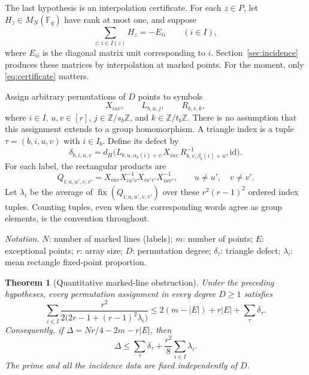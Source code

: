 \documentclass[11pt]{amsart}
\newtheorem{theorem}{Theorem}[section]
\theoremstyle{definition}
\theoremstyle{remark}
\numberwithin{equation}{section}
\newcommand{\F}{\mathbb F}
\newcommand{\Z}{\mathbb Z}
\newcommand{\id}{\mathrm{id}}
\begin{document}
The last hypothesis is an interpolation certificate. For each
$z\in P$, let $H_z\in M_N(\F_q)$ have rank at most one, and suppose
\begin{equation}\label{eq:certificate}
 \sum_{z:\,i\in I(z)}H_z=-E_{ii}\qquad(i\in I),
\end{equation}
where $E_{ii}$ is the diagonal matrix unit corresponding to $i$.
Section~\ref{sec:incidence} produces these matrices by interpolation
at marked points. For the moment, only \eqref{eq:certificate} matters.

Assign arbitrary permutations of $D$ points to symbols
\[
 X_{iuv},\qquad L_{b,u,j},\qquad R_{b,v,k},
\]
where $i\in I$, $u,v\in[r]$, $j\in\Z/s_b\Z$, and
$k\in\Z/t_b\Z$. There is no assumption that this assignment extends
to a group homomorphism. A triangle index is a tuple
$\tau=(b,i,u,v)$ with $i\in I_b$. Define its defect by
\begin{equation}\label{eq:triangle-defect}
 \delta_{b,i,u,v}=
 d_H\bigl(L_{b,u,\alpha_b(i)+v}\,X_{iuv}\,
                  R_{b,v,\beta_b(i)+u}^{-1},\id\bigr).
\end{equation}
For each label, the rectangular products are
\begin{equation}\label{eq:matrix-rectangles}
 Q_{i;u,u',v,v'}=
 X_{iuv}X_{iu'v}^{-1}X_{iu'v'}X_{iuv'}^{-1},
 \qquad u\ne u',\quad v\ne v'.
\end{equation}
Let $\lambda_i$ be the average of
$\operatorname{fix}(Q_{i;u,u',v,v'})$ over these
$r^2(r-1)^2$ ordered index tuples. Counting tuples, even when the
corresponding words agree as group elements, is the convention
throughout.

\noindent\emph{Notation.}
$N$: number of marked lines (labels); $m$: number of points;
$E$: exceptional points; $r$: array size; $D$: permutation degree;
$\delta_\tau$: triangle defect; $\lambda_i$: mean rectangle
fixed-point proportion.

\begin{theorem}[Quantitative marked-line obstruction]\label{thm:rank}
Under the preceding hypotheses, every permutation assignment in
every degree $D\ge1$ satisfies
\begin{equation}\label{eq:exact-rank-obstruction}
 \sum_{i\in I}
 \frac{r^2}{2\bigl(2r-1+(r-1)^2\lambda_i\bigr)}
 \le 2(m-|E|)+r|E|+\sum_\tau\delta_\tau.
\end{equation}
Consequently, if $\Delta=Nr/4-2m-r|E|$, then
\begin{equation}\label{eq:robust-obstruction}
 \Delta\le\sum_\tau\delta_\tau
                   +\frac{r^2}{8}\sum_{i\in I}\lambda_i.
\end{equation}
The prime and all the incidence data are fixed independently of $D$.
\end{theorem}
\end{document}
